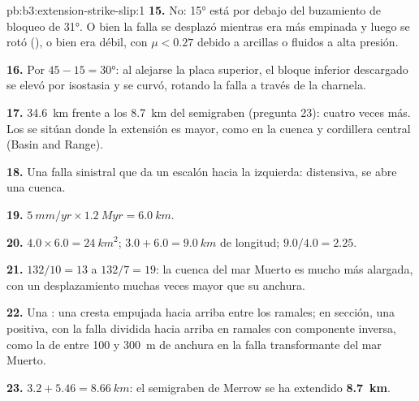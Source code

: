 \begin{solution}{pb:b3:extension-strike-slip:1}
\textbf{15.} No: \ang{15} está por debajo del buzamiento de bloqueo de \ang{31}. O bien la
falla se desplazó mientras era más empinada y luego se rotó (), o bien
era débil, con $\mu < 0.27$ debido a arcillas o fluidos a alta presión.

\textbf{16.} Por $45 - 15 = \ang{30}$: al alejarse la placa superior, el
bloque inferior descargado se elevó por isostasia y se curvó, rotando la falla a través de la
charnela.

\textbf{17.} \qty{34.6}{km} frente a los \qty{8.7}{km} del semigraben (pregunta
23): cuatro veces más. Los  se sitúan donde la extensión es mayor, como en
la cuenca y cordillera central (Basin and Range).

\textbf{18.} Una falla sinistral que da un escalón hacia la izquierda: distensiva, se abre una cuenca.

\textbf{19.} $\qty{5}{mm/yr}\times\qty{1.2}{Myr} = \qty{6.0}{km}$.

\textbf{20.} $4.0\times6.0 = \qty{24}{km^2}$; $3.0 + 6.0 = \qty{9.0}{km}$ de longitud;
$9.0/4.0 = 2.25$.

\textbf{21.} $132/10 = 13$ a $132/7 = 19$: la cuenca del mar Muerto es mucho más
alargada, con un desplazamiento muchas veces mayor que su anchura.

\textbf{22.} Una : una cresta empujada hacia arriba entre los ramales; en
sección, una  positiva, con la falla dividida hacia arriba en ramales
con componente inversa, como la de entre 100 y \qty{300}{m} de anchura en la
falla transformante del mar Muerto.

\textbf{23.} $3.2 + 5.46 = \qty{8.66}{km}$: el semigraben de Merrow se ha
extendido \textbf{\qty[text-series-to-math=true]{8.7}{km}}.
\end{solution}
